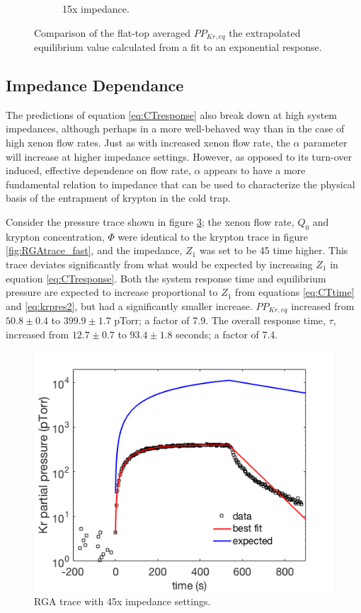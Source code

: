 \begin{figure}[h!]
\begin{subfigure}{0.5\textwidth}
  \caption{15x impedance.}
  \label{fig:flowresponse_15x}
\end{subfigure}
\caption{Comparison of the flat-top averaged $PP_{Kr,eq}$ the extrapolated equilibrium value calculated from a fit to an exponential response.} 
\label{fig:flowresponse}
\end{figure}



\subsection{Impedance Dependance}
\label{sec:impedance_real}
The predictions of equation \ref{eq:CTresponse} also break down at high system impedances, although perhaps in a more well-behaved way than in the case of high xenon flow rates. Just as with increased xenon flow rate, the $\alpha$ parameter will increase at higher impedance settings. However, as opposed to its turn-over induced, effective dependence on flow rate, $\alpha$ appears to have a more fundamental relation to impedance that can be used to characterize the physical basis of the entrapment of krypton in the cold trap.

Consider the pressure trace shown in figure \ref{fig:RGAtrace_slow}; the xenon flow rate, $Q_0$ and krypton concentration, $\Phi$ were identical to the krypton trace in figure \ref{fig:RGAtrace_fast}, and the impedance, $Z_1$ was set to be 45 time higher. This trace deviates significantly from what would be expected by increasing $Z_1$ in equation \ref{eq:CTresponse}. Both the system response time and equilibrium pressure are expected to increase proportional to $Z_1$ from equations \ref{eq:CTtime} and \ref{eq:krpres2}, but had a significantly smaller increase. $PP_{Kr,eq}$ increased from $50.8 \pm 0.4$ to $399.9\pm 1.7$ pTorr; a factor of 7.9. The overall response time, $\tau$, increased from $12.7 \pm 0.7$ to $93.4 \pm 1.8$ seconds; a factor of 7.4. 
\begin{figure}[h!]
\centering
\includegraphics[width=\textwidth]{Figures/RGAtrace_fit_slow_wexp.png}
\caption{RGA trace with 45x impedance settings. }
\label{fig:RGAtrace_slow}
\end{figure}

